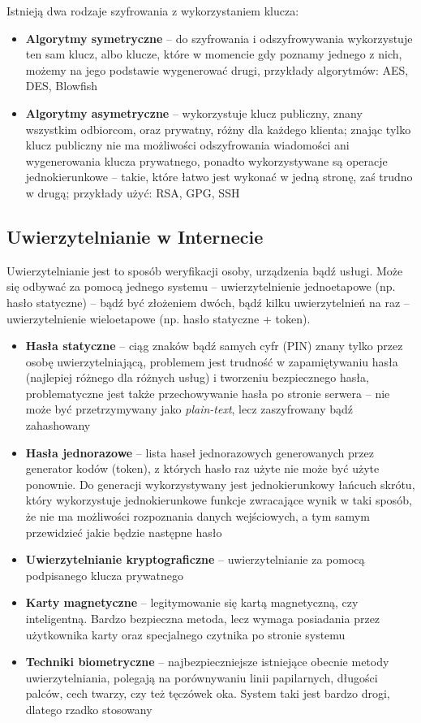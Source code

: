 Istnieją dwa rodzaje szyfrowania z wykorzystaniem klucza:
\begin{itemize}
	\item \textbf{Algorytmy symetryczne} -- do szyfrowania i odszyfrowywania wykorzystuje ten sam klucz, albo klucze, które w momencie gdy poznamy jednego z nich, możemy na jego podstawie wygenerować drugi, przykłady algorytmów: AES, DES, Blowfish
	\item \textbf{Algorytmy asymetryczne} -- wykorzystuje klucz publiczny, znany wszystkim odbiorcom, oraz prywatny, różny dla każdego klienta; znając tylko klucz publiczny nie ma możliwości odszyfrowania wiadomości ani wygenerowania klucza prywatnego, ponadto wykorzystywane są operacje jednokierunkowe -- takie, które łatwo jest wykonać w jedną stronę, zaś trudno w drugą; przykłady użyć: RSA, GPG, SSH 
\end{itemize}

\subsection{Uwierzytelnianie w Internecie}

Uwierzytelnianie jest to sposób weryfikacji osoby, urządzenia bądź usługi. Może się odbywać za pomocą jednego systemu -- uwierzytelnienie jednoetapowe (np. hasło statyczne) -- bądź być złożeniem dwóch, bądź kilku uwierzytelnień na raz -- uwierzytelnienie wieloetapowe (np. hasło statyczne + token).
\begin{itemize}
	\item \textbf{Hasła statyczne} -- ciąg znaków bądź samych cyfr (PIN) znany tylko przez osobę uwierzytelniającą, problemem jest trudność w zapamiętywaniu hasła (najlepiej różnego dla różnych usług) i tworzeniu bezpiecznego hasła, problematyczne jest także przechowywanie hasła po stronie serwera -- nie może być przetrzymywany jako \textit{plain-text}, lecz zaszyfrowany bądź zahashowany
    \item \textbf{Hasła jednorazowe} -- lista haseł jednorazowych generowanych przez generator kodów (token), z których hasło raz użyte nie może być użyte ponownie. Do generacji wykorzystywany jest jednokierunkowy łańcuch skrótu, który wykorzystuje jednokierunkowe funkcje zwracające wynik w taki sposób, że nie ma możliwości rozpoznania danych wejściowych, a tym samym przewidzieć jakie będzie następne hasło
    \item \textbf{Uwierzytelnianie kryptograficzne} -- uwierzytelnianie za pomocą podpisanego klucza prywatnego
    \item \textbf{Karty magnetyczne} -- legitymowanie się kartą magnetyczną, czy inteligentną. Bardzo bezpieczna metoda, lecz wymaga posiadania przez użytkownika karty oraz specjalnego czytnika po stronie systemu
    \item \textbf{Techniki biometryczne} -- najbezpieczniejsze istniejące obecnie metody uwierzytelniania, polegają na porównywaniu linii papilarnych, długości palców, cech twarzy, czy też tęczówek oka. System taki jest bardzo drogi, dlatego rzadko stosowany
\end{itemize}
